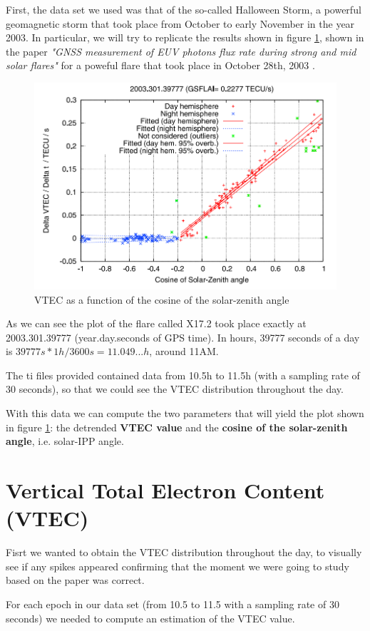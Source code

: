 First, the data set we used was that of the so-called Halloween Storm, a powerful geomagnetic storm that took place from October to early November in the year 2003. In particular, we will try to replicate the results shown in figure \ref{fig:halloweenPaper}, shown in the paper \textit{"GNSS measurement of EUV photons flux rate during strong and mid solar flares"} for a poweful flare that took place in October 28th, 2003 \cite{hernandez2012gnss}.

\begin{figure}[!htb]
	\begin{centering}
		\includegraphics[width=0.5\linewidth]{images/ch4/halloweenPaper.png}
		\caption{VTEC as a function of the cosine of the solar-zenith angle}
		\label{fig:halloweenPaper}
	\end{centering}
\end{figure}

As we can see the plot of the flare called X17.2 took place exactly at 2003.301.39777 (year.day.seconds of GPS time). In hours, 39777 seconds of a day is $39777s * 1h/3600s = 11.049...h$, around 11AM. 

The ti files provided contained data from 10.5h to 11.5h (with a sampling rate of 30 seconds), so that we could see the VTEC distribution throughout the day.

With this data we can compute the two parameters that will yield the plot shown in figure \ref{fig:halloweenPaper}: the detrended \textbf{VTEC value} and the \textbf{cosine of the solar-zenith angle}, i.e. solar-IPP angle.

\section{Vertical Total Electron Content (VTEC)}

Fisrt we wanted to obtain the VTEC distribution throughout the day, to visually see if any spikes appeared confirming that the moment we were going to study based on the paper was correct.

For each epoch in our data set (from 10.5 to 11.5 with a sampling rate of 30 seconds) we needed to compute an estimation of the VTEC value.

